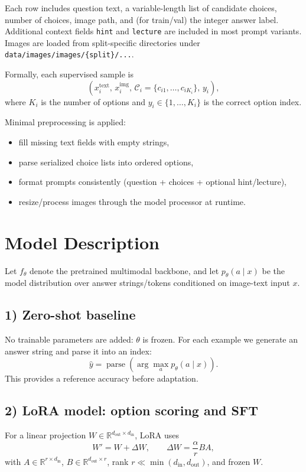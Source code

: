 \documentclass{article}
\begin{document}
Each row includes question text, a variable-length list of candidate choices, number of choices, image path, and (for train/val) the integer answer label. Additional context fields \texttt{hint} and \texttt{lecture} are included in most prompt variants. Images are loaded from split-specific directories under \texttt{data/images/images/\{split\}/...}.

Formally, each supervised sample is
\[
\left(x_i^{\text{text}},\, x_i^{\text{img}},\, \mathcal{C}_i=\{c_{i1},\dots,c_{iK_i}\},\, y_i\right),
\]
where $K_i$ is the number of options and $y_i \in \{1,\dots,K_i\}$ is the correct option index.

Minimal preprocessing is applied:
\begin{itemize}
    \item fill missing text fields with empty strings,
    \item parse serialized choice lists into ordered options,
    \item format prompts consistently (question + choices + optional hint/lecture),
    \item resize/process images through the model processor at runtime.
\end{itemize}

\section{Model Description}

Let $f_{\theta}$ denote the pretrained multimodal backbone, and let $p_{\theta}(a \mid x)$ be the model distribution over answer strings/tokens conditioned on image-text input $x$.

\subsection*{1) Zero-shot baseline}

No trainable parameters are added: $\theta$ is frozen. For each example we generate an answer string and parse it into an index:
\[
\hat{y} = \operatorname*{parse}\!\left(\arg\max_{a} p_{\theta}(a \mid x)\right).
\]
This provides a reference accuracy before adaptation.

\subsection*{2) LoRA model: option scoring and SFT}

For a linear projection $W \in \mathbb{R}^{d_{\text{out}}\times d_{\text{in}}}$, LoRA uses
\[
W' = W + \Delta W,\qquad
\Delta W = \frac{\alpha}{r}BA,
\]
with $A \in \mathbb{R}^{r\times d_{\text{in}}}$, $B \in \mathbb{R}^{d_{\text{out}}\times r}$, rank $r \ll \min(d_{\text{in}},d_{\text{out}})$, and frozen $W$.
\end{document}
